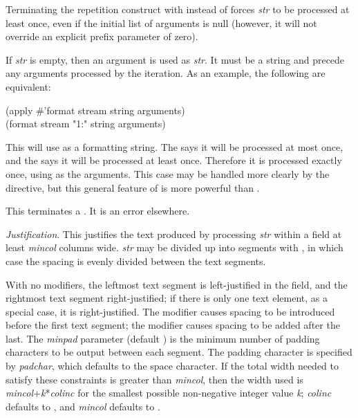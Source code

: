 \begin{flushdesc}
Terminating the repetition construct with \cd{{\Xtilde}:{\Xrbrace}} instead of
\cd{{\Xtilde}{\Xrbrace}} forces \emph{str} to be processed at least once, even if
the initial list of arguments is null (however, it will not override an explicit
prefix parameter of zero).

If \emph{str} is empty, then an argument is used as \emph{str}.  It must be a string
and precede any arguments processed by the iteration.  As an example,
the following are equivalent:
\begin{lisp}
(apply \#'format stream string arguments) \\
(format stream "{\Xtilde}1{\Xlbrace}{\Xtilde}:{\Xrbrace}" string arguments)
\end{lisp}
This will use  as a formatting string.  The  says it will
be processed at most once, and the \cd{{\Xtilde}:{\Xrbrace}} says it will be processed at least once.
Therefore it is processed exactly once, using  as the arguments.
This case may be handled more clearly by the  directive,
but this general feature of \cd{{\Xtilde}{\Xlbrace}}
is more powerful than .

\item[\cd{{\Xtilde}{\Xrbrace}}]
This terminates a \cd{{\Xtilde}{\Xlbrace}}.  It is an error elsewhere.

\item[\cd{{\Xtilde}\emph{mincol},\emph{colinc},\emph{minpad},\emph{padchar}<\emph{str}{\Xtilde}>}]
\emph{Justification}.
This justifies the text produced by processing \emph{str}
within a field at least \emph{mincol} columns wide.  \emph{str}
may be divided up into segments with \cd{{\Xtilde};}, in which case the
spacing is evenly divided between the text segments.

With no modifiers, the leftmost text segment is left-justified in the
field, and the rightmost text segment right-justified;  if there is
only one text element, as a special case, it is right-justified.
The \cd{:} modifier causes
spacing to be introduced before the first text segment;  the \cd{{\Xatsign}}
modifier causes spacing to be added after the last.
The \emph{minpad} parameter (default ) is the minimum number of
padding characters to be output between each segment.
The padding character is specified by \emph{padchar},
which defaults to the space character.
If the total width needed to satisfy these constraints is greater
than \emph{mincol}, then the width used is \emph{mincol}+\emph{k}*\emph{colinc}
for the smallest possible non-negative integer value \emph{k};
\emph{colinc} defaults to , and \emph{mincol} defaults to .


\end{flushdesc}
